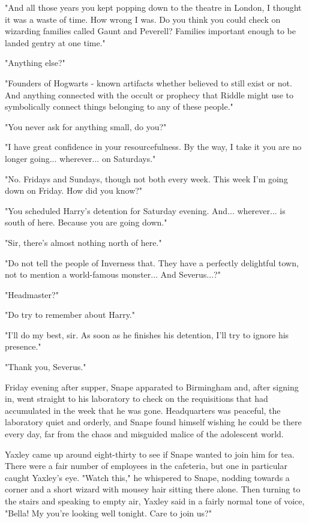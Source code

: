 \documentclass[a4paper,11pt]{article}
\begin{document}
"And all those years you kept popping down to the theatre in London, I thought it was a waste of time. How wrong I was. Do you think you could check on wizarding families called Gaunt and Peverell? Families important enough to be landed gentry at one time."

"Anything else?"

"Founders of Hogwarts - known artifacts whether believed to still exist or not. And anything connected with the occult or prophecy that Riddle might use to symbolically connect things belonging to any of these people."

"You never ask for anything small, do you?"

"I have great confidence in your resourcefulness. By the way, I take it you are no longer going... wherever... on Saturdays."

"No. Fridays and Sundays, though not both every week. This week I'm going down on Friday. How did you know?"

"You scheduled Harry's detention for Saturday evening. And... wherever... is south of here. Because you are going down."

"Sir, there's almost nothing north of here."

"Do not tell the people of Inverness that. They have a perfectly delightful town, not to mention a world-famous monster... And Severus...?"

"Headmaster?"

"Do try to remember about Harry."

"I'll do my best, sir. As soon as he finishes his detention, I'll try to ignore his presence."

"Thank you, Severus."

Friday evening after supper, Snape apparated to Birmingham and, after signing in, went straight to his laboratory to check on the requisitions that had accumulated in the week that he was gone. Headquarters was peaceful, the laboratory quiet and orderly, and Snape found himself wishing he could be there every day, far from the chaos and misguided malice of the adolescent world.

Yaxley came up around eight-thirty to see if Snape wanted to join him for tea. There were a fair number of employees in the cafeteria, but one in particular caught Yaxley's eye. "Watch this," he whispered to Snape, nodding towards a corner and a short wizard with mousey hair sitting there alone. Then turning to the stairs and speaking to empty air, Yaxley said in a fairly normal tone of voice, "Bella! My you're looking well tonight. Care to join us?"
\end{document}
